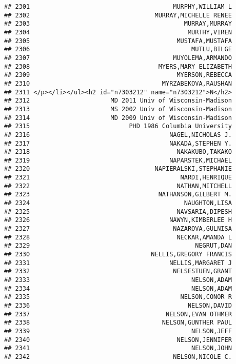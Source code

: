 \documentclass[
]{article}
\begin{document}
\begin{verbatim}
## 2301                                       MURPHY,WILLIAM L
## 2302                                  MURRAY,MICHELLE RENEE
## 2303                                          MURRAY,MURRAY
## 2304                                           MURTHY,VIREN
## 2305                                        MUSTAFA,MUSTAFA
## 2306                                            MUTLU,BILGE
## 2307                                       MUYOLEMA,ARMANDO
## 2308                                   MYERS,MARY ELIZABETH
## 2309                                        MYERSON,REBECCA
## 2310                                    MYRZABEKOVA,RAUSHAN
## 2311 </p></li></ul><h2 id="n7303212" name="n7303212">N</h2>
## 2312                      MD 2011 Univ of Wisconsin-Madison
## 2313                      MS 2002 Univ of Wisconsin-Madison
## 2314                      MD 2009 Univ of Wisconsin-Madison
## 2315                           PHD 1986 Columbia University
## 2316                                      NAGEL,NICHOLAS J.
## 2317                                      NAKADA,STEPHEN Y.
## 2318                                        NAKAKUBO,TAKAKO
## 2319                                      NAPARSTEK,MICHAEL
## 2320                                  NAPIERALSKI,STEPHANIE
## 2321                                         NARDI,HENRIQUE
## 2322                                        NATHAN,MITCHELL
## 2323                                   NATHANSON,GILBERT M.
## 2324                                          NAUGHTON,LISA
## 2325                                        NAVSARIA,DIPESH
## 2326                                      NAWYN,KIMBERLEE H
## 2327                                       NAZAROVA,GULNISA
## 2328                                        NECKAR,AMANDA L
## 2329                                             NEGRUT,DAN
## 2330                                 NELLIS,GREGORY FRANCIS
## 2331                                      NELLIS,MARGARET J
## 2332                                       NELSESTUEN,GRANT
## 2333                                            NELSON,ADAM
## 2334                                            NELSON,ADAM
## 2335                                         NELSON,CONOR R
## 2336                                           NELSON,DAVID
## 2337                                     NELSON,EVAN OTHMER
## 2338                                    NELSON,GUNTHER PAUL
## 2339                                            NELSON,JEFF
## 2340                                        NELSON,JENNIFER
## 2341                                            NELSON,JOHN
## 2342                                       NELSON,NICOLE C.

\end{verbatim}
\end{document}
